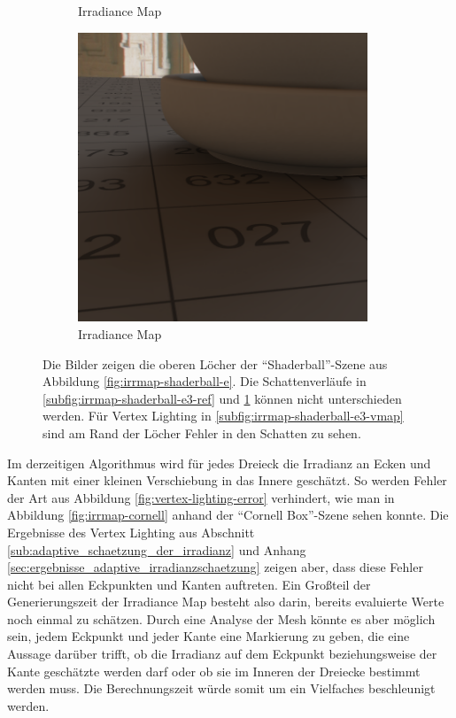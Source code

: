 \begin{figure}[H]
\begin{subfigure}[t]{0.5\textwidth}
				\caption{Irradiance Map}
				\label{subfig:irrmap-shaderball-e3-irrmap}
			\end{subfigure}
			\begin{subfigure}[t]{0.5\textwidth}
				\center
				\includegraphics[width=0.95\textwidth]{pic/irrmap-shaderball_e4-irrmap.png}
				\caption{Irradiance Map}
				\label{subfig:irrmap-shaderball-e4-irrmap}
			\end{subfigure}
			\caption[Irradiance Map der \enquote{Shaderball}-Szene mit der \enquote{Ennis-Brown House}-HDR]{Die Bilder zeigen die oberen Löcher der \enquote{Shaderball}-Szene aus Abbildung \ref{fig:irrmap-shaderball-e}. Die Schattenverläufe in \ref{subfig:irrmap-shaderball-e3-ref} und \ref{subfig:irrmap-shaderball-e3-irrmap} können nicht unterschieden werden. Für Vertex Lighting in \ref{subfig:irrmap-shaderball-e3-vmap} sind am Rand der Löcher Fehler in den Schatten zu sehen.}
			\label{fig:irrmap-shaderball-e3}
		\end{figure}

		Im derzeitigen Algorithmus wird für jedes Dreieck die Irradianz an Ecken und Kanten mit einer kleinen Verschiebung in das Innere  geschätzt.
		So werden Fehler der Art aus Abbildung \ref{fig:vertex-lighting-error} verhindert, wie man in Abbildung \ref{fig:irrmap-cornell} anhand der \enquote{Cornell Box}-Szene sehen konnte.
		Die Ergebnisse des Vertex Lighting aus Abschnitt \ref{sub:adaptive_schaetzung_der_irradianz} und Anhang \ref{sec:ergebnisse_adaptive_irradianzschaetzung} zeigen aber, dass diese Fehler nicht bei allen Eckpunkten und Kanten auftreten.
		Ein Großteil der Generierungszeit der Irradiance Map besteht also darin, bereits evaluierte Werte noch einmal zu schätzen.
		Durch eine Analyse der Mesh könnte es aber möglich sein, jedem Eckpunkt und jeder Kante eine Markierung zu geben, die eine Aussage darüber trifft, ob die Irradianz auf dem Eckpunkt beziehungsweise der Kante geschätzte werden darf oder ob sie im Inneren der Dreiecke bestimmt werden muss.
		Die Berechnungszeit würde somit um ein Vielfaches beschleunigt werden.

		\FloatBarrier


